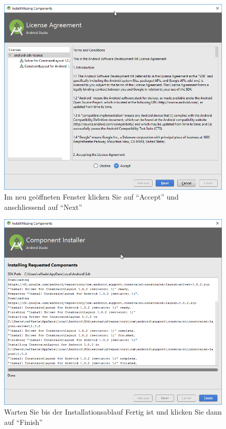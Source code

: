 \documentclass[a4paper,10pt,xetex]{article}
\begin{document}
\begin{figure}
  \centering
  \includegraphics[width=\textwidth]{Installation/2-7}
  \caption{Im neu geöffneten Fenster klicken Sie auf ``Accept'' und anschliessend auf ``Next''}
\end{figure}

\begin{figure}
  \centering
  \includegraphics[width=\textwidth]{Installation/2-8}
  \caption{Warten Sie bis der Installationsablauf Fertig ist und klicken Sie dann auf ``Finish''}
\end{figure}
\end{document}
